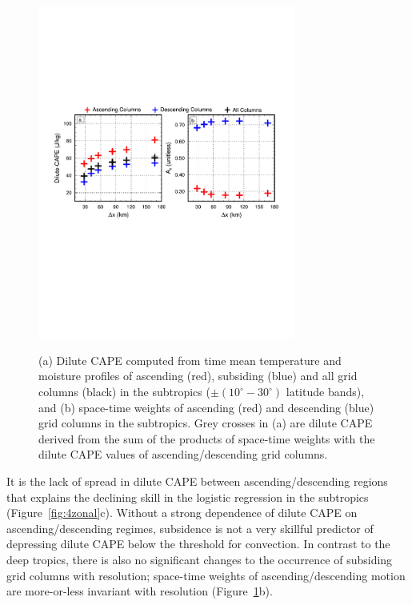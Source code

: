 \documentclass[alpha-refs]{wiley-article}
\begin{document}
\begin{figure}
\begin{center}
\noindent\includegraphics[width=20pc,angle=0]{figs/temp_cape-subtropics.pdf}\\
\end{center}
\caption{(a) Dilute CAPE computed from time mean temperature and moisture profiles of ascending (red), subsiding (blue) and all grid columns (black) in the subtropics ($\pm \left(10^{\circ}-30^{\circ} \right)$ latitude bands), and (b) space-time weights of ascending (red) and descending (blue) grid columns in the subtropics. Grey crosses in (a) are dilute CAPE derived from the sum of the products of space-time weights with the dilute CAPE values of ascending/descending grid columns.}
\label{fig:cape-subt}
\end{figure}

It is the lack of spread in dilute CAPE between ascending/descending regions that explains the declining skill in the logistic regression in the subtropics (Figure~\ref{fig:4zonal}c). Without a strong dependence of dilute CAPE on ascending/descending regimes, subsidence is not a very skillful predictor of depressing dilute CAPE below the threshold for convection. In contrast to the deep tropics, there is also no significant changes to the occurrence of subsiding grid columns with resolution; space-time weights of ascending/descending motion are more-or-less invariant with resolution (Figure~\ref{fig:cape-subt}b).
\end{document}
